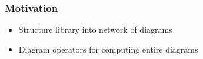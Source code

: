 \documentclass[t,12pt,numbers,fleqn,usenames,xcolor=dvipsnames]{beamer}
\newcommand{\icsg}{\cn{IdempotentCommutativeSemigroup}\xspace}
\begin{document}
\begin{frame}
\frametitle{Motivation}
\begin{itemize}
	\item Structure library into network of diagrams 
	\item Diagram operators for computing entire diagrams 
\end{itemize}
\end{frame}

\begin{comment}[fragile]{Motivation}
Building the algebraic hierarchy as a theory graph 
\begin{itemize}
	\item[] From: \textcolor{Blue}{\Magma \cn{(U,\_*\_)}}
	\item[] To: \textcolor{Blue}{\icsg \\ \qquad  \cn{(U,\_*\_,assoc,comm,idemp)}} 
\end{itemize}
\pause

\begin{onlyenv}<1>
Extremely Modular -- Tiny Theories 
\begin{itemize}
	\item Adding one definition at a time 
	\item All intermediate theories are defined 
\end{itemize}
\end{onlyenv}

\begin{onlyenv}<2>
	\scriptsize{
		\begin{center}
			\begin{tikzpicture}[scale=.8]
			\node (M)    at (0,0)      {\Magma};
			\node (CM) at (-4,-1) {\CommMagma};
			\node (SG)  at (0,-1)   {\Semigroup};
			\node (IM)  at  (4,-1)   {\IdempMagma};
			\draw[mono](M) -- (CM);
			\draw[mono](M) -- (SG); 
			\draw[mono](M) -- (IM);
			\node (CSG)  at (-5,-2)   {\CommutativeSemigroup};
			\node (ISG)    at (5,-2)    {\IdempotentSemigroup};
			\node (ICM)    at (0,-2)    {\IdempotentCommutativeMagma};
			\node (ACSG)  at (0,-3)   {\IdempotentCommutativeSemigroup};
			\draw[mono](CM) -- (CSG);
			\draw[mono](CM) -- (ICM);
			\draw[mono](IM) -- (ISG); 
			\draw[mono](IM) -- (ICM);
			\draw[mono](SG) -- (ISG); 
			\draw[mono](SG) -- (CSG);
			\draw[mono](CSG) -- (ACSG);
			\draw[mono](ISG) -- (ACSG);
			\draw[mono](ICM) -- (ACSG);
			\end{tikzpicture}
	\end{center}}
\end{onlyenv}
\end{comment}
\end{document}
